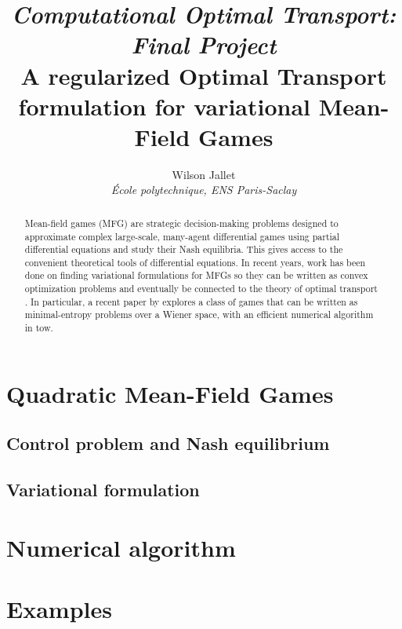 \documentclass[11pt]{article}
\author{
	Wilson Jallet\\
	\textit{École polytechnique, ENS Paris-Saclay}
}
\title{
	{\Large\itshape\sffamily Computational Optimal Transport: Final Project}\\
	{\Large A regularized Optimal Transport formulation for variational Mean-Field Games}}
\numberwithin{equation}{section}
\theoremstyle{definition}
\begin{document}
\maketitle


\begin{abstract}
	Mean-field games (MFG) are strategic decision-making problems designed to approximate complex large-scale, many-agent differential games using partial differential equations and study their Nash equilibria. This gives access to the convenient theoretical tools of differential equations. In recent years, work has been done on finding variational formulations for MFGs so they can be written as convex optimization problems and eventually be connected to the theory of optimal transport \cite{benamou:hal-01295299,benamou2015lagrangian}. In particular, a recent paper by \textcite{benamou2018entropy} explores a class of games that can be written as minimal-entropy problems over a Wiener space, with an efficient numerical algorithm in tow.
\end{abstract}



\section{Quadratic Mean-Field Games}

\subsection{Control problem and Nash equilibrium}



\subsection{Variational formulation}




\section{Numerical algorithm}





\section{Examples}


\end{document}
